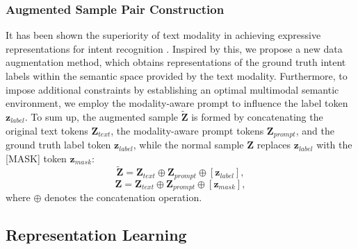\documentclass[letterpaper]{article}
\begin{document}
\subsubsection{Augmented Sample Pair Construction}
It has been shown the superiority of text modality in achieving expressive representations for intent recognition \cite{zhang2021deep}. Inspired by this, we propose a new data augmentation method, which obtains representations of the ground truth intent labels within the semantic space provided by the text modality. Furthermore, to impose additional constraints by establishing an optimal multimodal semantic environment, we employ the modality-aware prompt to influence the label token $\textbf{z}_{label}$. To sum up, the augmented sample $\widetilde{\textbf{Z}}$ is formed by concatenating the original text tokens $\textbf{Z}_{text}$, the modality-aware prompt tokens $\textbf{Z}_{prompt}$, and the ground truth label token $\textbf{z}_{label}$, while the normal sample $\textbf{Z}$ replaces $\textbf{z}_{label}$ with the [MASK] token $\textbf{z}_{mask}$:
\begin{equation}
\widetilde{\textbf{Z}} = \textbf{Z}_{text} \oplus \textbf{Z}_{prompt} \oplus [\textbf{z}_{label}],
\end{equation}
\begin{equation}
\textbf{Z} = \textbf{Z}_{text} \oplus \textbf{Z}_{prompt} \oplus [\textbf{z}_{mask}],
\end{equation}
where $\oplus$ denotes the concatenation operation.

\subsection{Representation Learning}
\end{document}
